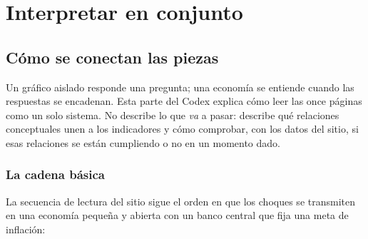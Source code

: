 \providecommand{\cmsym}[1]{{\fontspec{DejaVu Sans}#1}}

\part{Interpretar en conjunto}

\chapter{Cómo se conectan las piezas}
\label{es:i:cadena}

Un gráfico aislado responde una pregunta; una economía se entiende cuando las respuestas se encadenan. Esta parte
del Codex explica cómo leer las once páginas como un solo sistema. No describe lo que \emph{va} a pasar: describe
qué relaciones conceptuales unen a los indicadores y cómo comprobar, con los datos del sitio, si esas relaciones
se están cumpliendo o no en un momento dado.

\section{La cadena básica}

La secuencia de lectura del sitio sigue el orden en que los choques se transmiten en una economía pequeña y
abierta con un banco central que fija una meta de inflación:

